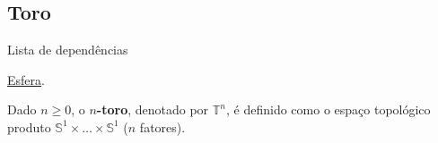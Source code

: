 \subsection{Toro}
\label{toro-def}
\begin{titlemize}{Lista de dependências}
	\item \hyperref[esfera-def]{Esfera}. %
\end{titlemize}
\begin{defi}
     Dado $n\geq 0$, o \textbf{$n$-toro}, denotado por $\mathbb{T}^n$, é definido como o espaço topológico produto $\mathbb{S}^1\times \ldots \times \mathbb{S}^1$ ($n$ fatores).
\end{defi}